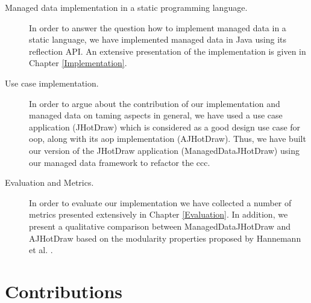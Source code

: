 \begin{description}

  \item[Managed data implementation in a static programming language.]
  In order to answer the question how to implement managed data in a static language, we have implemented managed data in Java using its reflection API. 
  An extensive presentation of the implementation is given in Chapter \ref{Implementation}.

  \item[Use case implementation.] 
  In order to argue about the contribution of our implementation and managed data on taming aspects in general, we have used a use case application (JHotDraw) which is considered as a good design use case for \ac{oop}, along with its \ac{aop} implementation (AJHotDraw).
  Thus, we have built our version of the JHotDraw application (ManagedDataJHotDraw) using our managed data framework to refactor the \ac{ccc}.

  \item[Evaluation and Metrics.]
  In order to evaluate our implementation we have collected a number of metrics presented extensively in Chapter \ref{Evaluation}.
  In addition, we present a qualitative comparison between ManagedDataJHotDraw and AJHotDraw based on the modularity properties proposed by Hannemann et al. \cite{hannemann2005role}.

\end{description}	

\section{Contributions}\label{Contributions}

